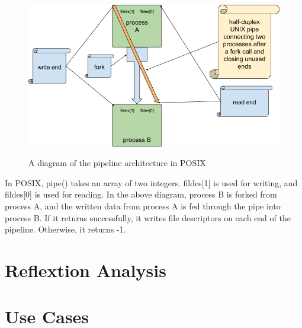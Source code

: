 \documentclass[12pt, dvipsnames, a4paper]{article}
\begin{document}
\begin{figure}[hbt!]
	\centering
	\includegraphics[width=570pt]{assets/localipc2.png}
	\caption{A diagram of the pipeline architecture in POSIX} \cite{rytarowski}
\end{figure}

In POSIX, pipe() takes an array of two integers. fildes[1] is used for writing, and fildes[0] is used for reading. In the above diagram, process B is forked from process A, and the written data from process A is fed through the pipe into process B. If it returns successfully, it writes file descriptors on each end of the pipeline. Otherwise, it returns -1.

\section{Reflextion Analysis}

\clearpage
\section{Use Cases}
\end{document}

